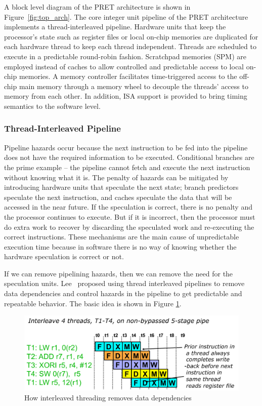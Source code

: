 \documentclass[times, 10pt,twocolumn]{article}
\begin{document}
A block level diagram of the PRET architecture is shown in Figure~\ref{fig:top_arch}. The core integer unit pipeline of the PRET architecture implements a thread-interleaved pipeline. Hardware units that keep the processor's state such as register files or local on-chip memories are duplicated for each hardware thread to keep each thread independent. Threads are scheduled to execute in a predictable round-robin fashion. Scratchpad memories (SPM)\cite{Banakar2002} are employed instead of caches to allow controlled and predictable access to local on-chip memories. A memory controller facilitates time-triggered access to the off-chip main memory through a memory wheel to decouple the threads' access to memory from each other. In addition, ISA support is provided to bring timing semantics to the software level.

\subsubsection {Thread-Interleaved Pipeline}
Pipeline hazards occur because the next instruction to be fed into the pipeline does not have the required information to be executed. Conditional branches are the prime example -- the pipeline cannot fetch and execute the next instruction without knowing what it is. The penalty of hazards can be mitigated by introducing hardware units that speculate the next state; branch predictors speculate the next instruction, and caches speculate the data that will be accessed in the near future. If the speculation is correct, there is no penalty and the processor continues to execute. But if it is incorrect, then the processor must do extra work to recover by discarding the speculated work and re-executing the correct instructions. These mechanisms are the main cause of unpredictable execution time because in software there is no way of knowing whether the hardware speculation is correct or not. 

If we can remove pipelining hazards, then we can remove the need for the speculation units. Lee~\cite{lee1987pipeline1} proposed using thread interleaved pipelines to remove data dependencies and control hazards in the pipeline to get predictable and repeatable behavior. The basic idea is shown in Figure \ref{fig:int_pipe}. 
\begin{figure}[ht]
  \centering
  \includegraphics[scale=.35]{./images/interleavedpipeline.pdf}
  \caption{How interleaved threading removes data dependencies}
  \label{fig:int_pipe}
\end{figure}
\end{document}

